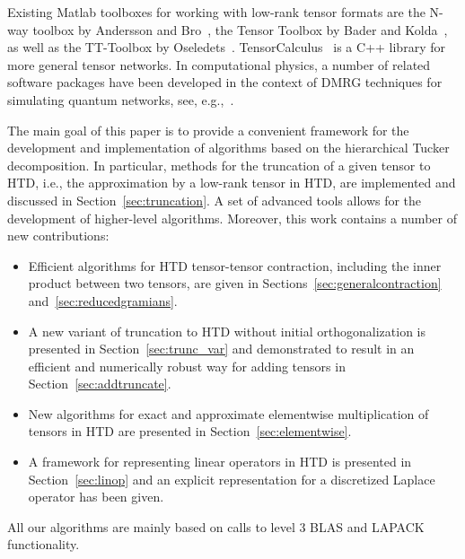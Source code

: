 \documentclass[11pt, a4paper]{article}
\begin{document}

Existing {\sc Matlab} toolboxes for working with low-rank tensor formats are the 
N-way toolbox by Andersson and Bro~\cite{AndB00}, the Tensor Toolbox by Bader and Kolda~\cite{BadK06,BadK07}, as well as the TT-Toolbox by Oseledets~\cite{tttoolbox,Osel09}.
TensorCalculus~\cite{tensorcalculus} is a C++ library for more general tensor networks.
In computational physics, a number of related software packages have been developed
in the context of DMRG techniques for simulating quantum networks, see, e.g.,~\cite{Bau11}.

The main goal of this paper is to provide a convenient framework for
the development and implementation of algorithms based on the
hierarchical Tucker decomposition. In particular, methods for the
truncation of a given tensor to HTD, i.e., the approximation by a
low-rank tensor in HTD, are implemented and discussed in
Section~\ref{sec:truncation}.
A set of advanced tools allows for the development of higher-level algorithms.
Moreover, this work contains a number of new contributions:
\begin{itemize}
\item Efficient algorithms for HTD tensor-tensor contraction, including the inner product
between two tensors, are given in Sections~\ref{sec:generalcontraction} and~\ref{sec:reducedgramians}.
 \item A new variant of truncation to HTD without initial orthogonalization
is presented in Section~\ref{sec:trunc_var} and demonstrated to result in an efficient and numerically 
robust way for adding tensors in Section~\ref{sec:addtruncate}.
\item New algorithms for exact and approximate elementwise multiplication of tensors in HTD are presented in Section~\ref{sec:elementwise}.
\item A framework for representing linear operators in HTD is presented in Section~\ref{sec:linop}
and an explicit representation for a discretized Laplace operator has been given.
\end{itemize}
All our algorithms are mainly based on calls to level 3 BLAS and LAPACK functionality. 
\end{document}
